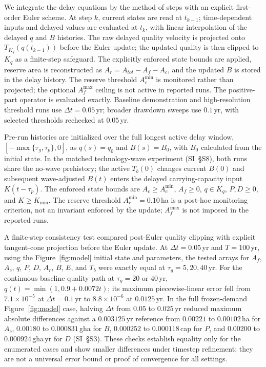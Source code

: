 \documentclass[preprint,12pt,authoryear]{elsarticle}
\newcommand{\Acmin}{A_c^{\min}}
\begin{document}
We integrate the delay equations by the method of steps with an explicit first-order Euler scheme. At step $k$, current states are read at $t_{k-1}$; time-dependent inputs and delayed values are evaluated at $t_k$, with linear interpolation of the delayed $q$ and $B$ histories. The raw delayed quality velocity is projected onto $T_{K_q}(q(t_{k-1}))$ before the Euler update; the updated quality is then clipped to $K_q$ as a finite-step safeguard. The explicitly enforced state bounds are applied, reserve area is reconstructed as $A_r=A_{tot}-A_f-A_c$, and the updated $B$ is stored in the delay history. The reserve threshold $A_r^{\min}$ is monitored rather than projected; the optional $A_f^{\max}$ ceiling is not active in reported runs. The positive-part operator is evaluated exactly. Baseline demonstration and high-resolution threshold runs use $\Delta t=0.05$\,yr; broader drawdown sweeps use $0.1$\,yr, with selected thresholds rechecked at $0.05$\,yr.

Pre-run histories are initialized over the full longest active delay window, $[-\max\{\tau_g,\tau_p\},0]$, as $q(s)=q_0$ and $B(s)=B_0$, with $B_0$ calculated from the initial state. In the matched technology-wave experiment (SI~\S S8), both runs share the no-wave prehistory; the active $T_b(0)$ changes current $B(0)$ and subsequent wave-adjusted $B(t)$ enters the delayed carrying-capacity input $K(t-\tau_p)$. The enforced state bounds are $A_c\ge\Acmin$, $A_f\ge0$, $q\in K_q$, $P,D\ge0$, and $K\ge K_{\min}$. The reserve threshold $A_r^{\min}=0.10$\,ha is a post-hoc monitoring criterion, not an invariant enforced by the update; $A_f^{\max}$ is not imposed in the reported runs.

A finite-step consistency test compared post-Euler quality clipping with explicit tangent-cone projection before the Euler update. At $\Delta t=0.05$\,yr and $T=100$\,yr, using the Figure~\ref{fig:model} initial state and parameters, the tested arrays for $A_f$, $A_c$, $q$, $P$, $D$, $A_r$, $B$, $E$, and $T_b$ were exactly equal at $\tau_g=5,20,40$\,yr. For the continuous baseline quality path at $\tau_g=20$ or $40$\,yr, $q(t)=\min(1,0.9+0.0072t)$; its maximum piecewise-linear error fell from $7.1\times10^{-5}$ at $\Delta t=0.1$\,yr to $8.8\times10^{-6}$ at $0.0125$\,yr. In the full frozen-demand Figure~\ref{fig:model} case, halving $\Delta t$ from $0.05$ to $0.025$\,yr reduced maximum absolute differences against a $0.003125$\,yr reference from $0.00221$ to $0.00102$\,ha for $A_c$, $0.00180$ to $0.000831$\,gha for $B$, $0.000252$ to $0.000118$\,cap for $P$, and $0.00200$ to $0.000924$\,gha\,yr for $D$ (SI~\S S3). These checks establish equality only for the enumerated cases and show smaller differences under timestep refinement; they are not a universal error bound or proof of convergence for all settings.
\end{document}
